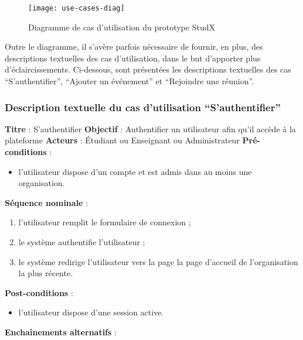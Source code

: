 \begin{figure}[H]
  \centering
  \texttt{[image: use-cases-diag]}
  \caption{Diagramme de cas d'utilisation du prototype StudX}
  \label{fig:use_case_diag}
\end{figure}


Outre le diagramme, il s'avère parfois nécessaire de fournir, en plus, des descriptions textuelles des cas 
d’utilisation, dans le but d’apporter plus d'éclaircissements. 
Ci-dessous, sont présentées les descriptions textuelles des cas “S’authentifier”, “Ajouter un événement” et “Rejoindre une réunion”.

\subsubsection{Description textuelle du cas d’utilisation “S’authentifier”}
\textbf{Titre} : S’authentifier\newline
\textbf{Objectif} : Authentifier un utilisateur afin qu’il accède à la plateforme\newline
\textbf{Acteurs} : Étudiant ou Enseignant ou Administrateur\newline
\textbf{Pré-conditions} : 
\begin{itemize}[noitemsep,topsep=0pt]
  \item l’utilisateur dispose d’un compte et est admis dans au moins une organisation.
\end{itemize}
\textbf{Séquence nominale} :
\begin{enumerate}[noitemsep,topsep=0pt]
  \item l’utilisateur remplit le formulaire de connexion ;
  \item le système authentifie l’utilisateur ;
  \item le système redirige l’utilisateur vers la page la page d'accueil de l’organisation la plus récente.
\end{enumerate}
\textbf{Post-conditions} : 
\begin{itemize}[noitemsep,topsep=0pt]
  \item l’utilisateur dispose d’une session active.
\end{itemize}
\textbf{Enchaînements alternatifs} :
